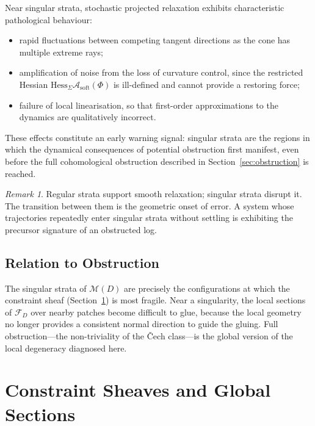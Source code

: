 \documentclass[12pt,oneside]{article}
\theoremstyle{plain}
\theoremstyle{definition}
\theoremstyle{remark}
\newtheorem{remark}[theorem]{Remark}
\newcommand{\M}{\mathcal{M}}
\newcommand{\Sh}{\mathcal{F}}
\newcommand{\D}{D}
\newcommand{\Asoft}{\mathcal{A}_{\mathrm{soft}}}
\newcommand{\HessSig}{\mathrm{Hess}_{\Sigma}}
\begin{document}
Near singular strata, stochastic projected relaxation exhibits characteristic
pathological behaviour:

\begin{itemize}
\item rapid fluctuations between competing tangent directions as the cone
      has multiple extreme rays;
\item amplification of noise from the loss of curvature control, since the
      restricted Hessian $\HessSig\Asoft(\Phi)$ is ill-defined and cannot
      provide a restoring force;
\item failure of local linearisation, so that first-order approximations to
      the dynamics are qualitatively incorrect.
\end{itemize}

These effects constitute an early warning signal: singular strata are the
regions in which the dynamical consequences of potential obstruction first
manifest, even before the full cohomological obstruction described in
Section~\ref{sec:obstruction} is reached.

\begin{remark}
Regular strata support smooth relaxation; singular strata disrupt it. The
transition between them is the geometric onset of error. A system whose
trajectories repeatedly enter singular strata without settling is exhibiting
the precursor signature of an obstructed log.
\end{remark}

\subsection{Relation to Obstruction}

The singular strata of $\M(\D)$ are precisely the configurations at which the
constraint sheaf (Section~\ref{sec:sheaf}) is most fragile. Near a singularity,
the local sections of $\Sh_\D$ over nearby patches become difficult to glue,
because the local geometry no longer provides a consistent normal direction to
guide the gluing. Full obstruction---the non-triviality of the \v{C}ech
class---is the global version of the local degeneracy diagnosed here.

\section{Constraint Sheaves and Global Sections}
\label{sec:sheaf}
\end{document}
